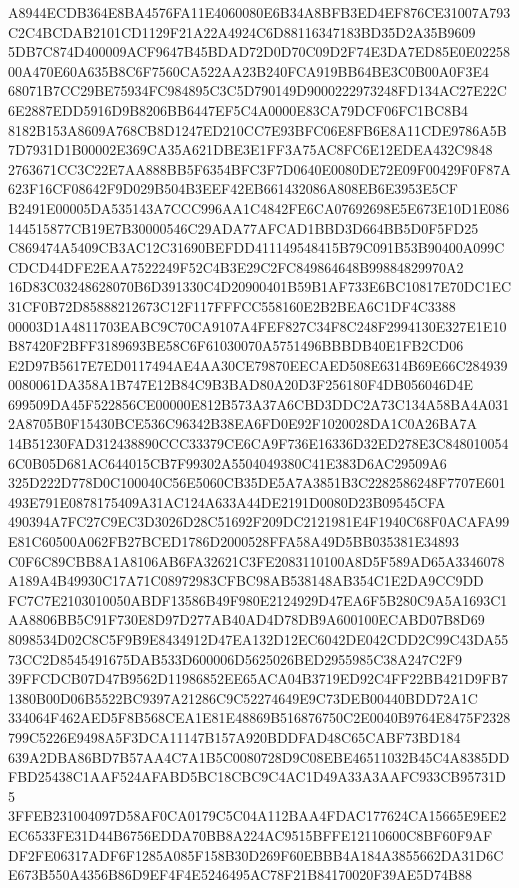 \documentclass[UTF8,fontset=fandol,zihao=-4,a4paper]{ctexart}
\begin{document}
{{A8944ECDB364E8BA4576FA11E4060080E6B34A8BFB3ED4EF876CE31007A793C2C4BCDAB2101CD1129F21A22A4924C6D88116347183BD35D2A35B9609
5DB7C874D400009ACF9647B45BDAD72D0D70C09D2F74E3DA7ED85E0E0225800A470E60A635B8C6F7560CA522AA23B240FCA919BB64BE3C0B00A0F3E4
68071B7CC29BE75934FC984895C3C5D790149D9000222973248FD134AC27E22C6E2887EDD5916D9B8206BB6447EF5C4A0000E83CA79DCF06FC1BC8B4
8182B153A8609A768CB8D1247ED210CC7E93BFC06E8FB6E8A11CDE9786A5B7D7931D1B00002E369CA35A621DBE3E1FF3A75AC8FC6E12EDEA432C9848
2763671CC3C22E7AA888BB5F6354BFC3F7D0640E0080DE72E09F00429F0F87A623F16CF08642F9D029B504B3EEF42EB661432086A808EB6E3953E5CF
B2491E00005DA535143A7CCC996AA1C4842FE6CA07692698E5E673E10D1E086144515877CB19E7B30000546C29ADA77AFCAD1BBD3D664BB5D0F5FD25
C869474A5409CB3AC12C31690BEFDD411149548415B79C091B53B90400A099CCDCD44DFE2EAA7522249F52C4B3E29C2FC849864648B99884829970A2
16D83C03248628070B6D391330C4D20900401B59B1AF733E6BC10817E70DC1EC31CF0B72D85888212673C12F117FFFCC558160E2B2BEA6C1DF4C3388
00003D1A4811703EABC9C70CA9107A4FEF827C34F8C248F2994130E327E1E10B87420F2BFF3189693BE58C6F61030070A5751496BBBDB40E1FB2CD06
E2D97B5617E7ED0117494AE4AA30CE79870EECAED508E6314B69E66C2849390080061DA358A1B747E12B84C9B3BAD80A20D3F256180F4DB056046D4E
699509DA45F522856CE00000E812B573A37A6CBD3DDC2A73C134A58BA4A0312A8705B0F15430BCE536C96342B38EA6FD0E92F1020028DA1C0A26BA7A
14B51230FAD312438890CCC33379CE6CA9F736E16336D32ED278E3C8480100546C0B05D681AC644015CB7F99302A5504049380C41E383D6AC29509A6
325D222D778D0C100040C56E5060CB35DE5A7A3851B3C2282586248F7707E601493E791E0878175409A31AC124A633A44DE2191D0080D23B09545CFA
490394A7FC27C9EC3D3026D28C51692F209DC2121981E4F1940C68F0ACAFA99E81C60500A062FB27BCED1786D2000528FFA58A49D5BB035381E34893
C0F6C89CBB8A1A8106AB6FA32621C3FE2083110100A8D5F589AD65A3346078A189A4B49930C17A71C08972983CFBC98AB538148AB354C1E2DA9CC9DD
FC7C7E2103010050ABDF13586B49F980E2124929D47EA6F5B280C9A5A1693C1AA8806BB5C91F730E8D97D277AB40AD4D78DB9A600100ECABD07B8D69
8098534D02C8C5F9B9E8434912D47EA132D12EC6042DE042CDD2C99C43DA5573CC2D8545491675DAB533D600006D5625026BED2955985C38A247C2F9
39FFCDCB07D47B9562D11986852EE65ACA04B3719ED92C4FF22BB421D9FB71380B00D06B5522BC9397A21286C9C52274649E9C73DEB00440BDD72A1C
334064F462AED5F8B568CEA1E81E48869B516876750C2E0040B9764E8475F2328799C5226E9498A5F3DCA11147B157A920BDDFAD48C65CABF73BD184
639A2DBA86BD7B57AA4C7A1B5C0080728D9C08EBE46511032B45C4A8385DDFBD25438C1AAF524AFABD5BC18CBC9C4AC1D49A33A3AAFC933CB95731D5
3FFEB231004097D58AF0CA0179C5C04A112BAA4FDAC177624CA15665E9EE2EC6533FE31D44B6756EDDA70BB8A224AC9515BFFE12110600C8BF60F9AF
DF2FE06317ADF6F1285A085F158B30D269F60EBBB4A184A3855662DA31D6CE673B550A4356B86D9EF4F4E5246495AC78F21B84170020F39AE5D74B88
}}
\end{document}
